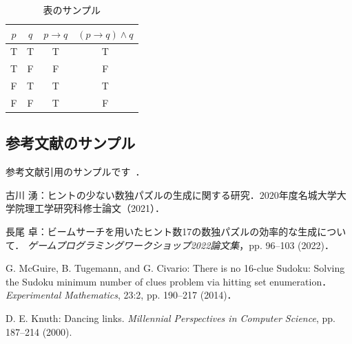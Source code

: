 \documentclass[a4paper, 9pt]{jarticle}
\begin{document}
\begin{論文概要}
\begin{table}[ht]
\centering
\caption{表のサンプル}
\label{tbl:sample1}
\begin{tabular}{|c|c||c|c|} \hline
$p$ & $q$ & $p\rightarrow q$ & $(p\rightarrow q)\wedge q$ \\ \hline
T & T & T & T \\ \hline
T & F & F & F \\ \hline
F & T & T & T \\ \hline
F & F & T & F \\ \hline
\end{tabular}
\end{table}

\subsection{参考文献のサンプル}
参考文献引用のサンプルです~\cite{paper1}\cite{paper2}．


\begin{thebibliography}{10}

  古川 湧：ヒントの少ない数独パズルの生成に関する研究．$2020$年度名城大学大学院理工学研究科修士論文（2021）．
  
  長尾 卓：ビームサーチを用いたヒント数17の数独パズルの効率的な生成について．
  {\it ゲームプログラミングワークショップ2022論文集}，pp. 96--103 (2022)．
  
  G. McGuire, B. Tugemann, and G. Civario:
  There is no 16-clue Sudoku: Solving the Sudoku minimum number of clues problem via hitting set enumeration．
  {\it Experimental Mathematics}, 23:2, pp. 190--217 (2014)．
  
  D. E. Knuth: Dancing links. 
  {\it Millennial Perspectives in Computer Science}, pp. 187--214 (2000).

  
  
\end{thebibliography}

\end{論文概要} %
\end{document}
